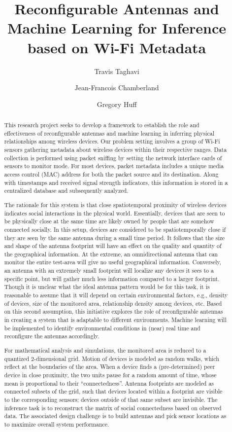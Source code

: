 \documentclass{ursiNRSM}
\title{Reconfigurable Antennas and Machine Learning for Inference based on Wi-Fi Metadata}
\author[org1]{Travis Taghavi}
\author[org1]{Jean-Francois Chamberland}
\author[org1]{Gregory Huff}
\begin{document}
\begin{abstract}

This research project seeks to develop a framework to establish the role and effectiveness of reconfigurable antennas and machine learning in inferring physical relationships among wireless devices.
Our problem setting involves a group of Wi-Fi sensors gathering metadata about wireless devices within their respective ranges.
Data collection is performed using packet sniffing by setting the network interface cards of sensors to monitor mode.
For most devices, packet metadata includes a unique media access control (MAC) address for both the packet source and its destination.
Along with timestamps and received signal strength indicators, this information is stored in a centralized database and subsequently analyzed.

The rationale for this system is that close spatiotemporal proximity of wireless devices indicates social interactions in the physical world.
Essentially, devices that are seen to be physically close at the same time are likely owned by people that are somehow connected socially.
In this setup, devices are considered to be spatiotemporally close if they are seen by the same antenna during a small time period.
It follows that the size and shape of the antenna footprint will have an effect on the quality and quantity of the geographical information.
At the extreme, an omnidirectional antenna that can monitor the entire test-area will give no useful geographical information.
Conversely, an antenna with an extremely small footprint will localize any devices it sees to a specific point, but will gather much less information compared to a larger footprint.
Though it is unclear what the ideal antenna pattern would be for this task, it is reasonable to assume that it will depend on certain environmental factors, e.g., density of devices, size of the monitored area, relationship density among devices, etc.
Based on this second assumption, this initiative explores the role of reconfigurable antennas in creating a system that is adaptable to different environments.
Machine learning will be implemented to identify environmental conditions in (near) real time and reconfigure the antennas accordingly.

For mathematical analysis and simulations, the monitored area is reduced to a quantized 2-dimensional grid.
Motion of devices is modeled as random walks, which reflect at the boundaries of the area.
When a device finds a (pre-determined) peer device in close proximity, the two units pause for a random amount of time, whose mean is proportional to their ``connectedness''.
Antenna footprints are modeled as connected subsets of the grid, such that devices located within a footprint are visible to the corresponding sensors; devices outside of that same subset are invisible.
The inference task is to reconstruct the matrix of social connectedness based on observed data.
The associated design challenge is to build antennas and pick sensor locations as to maximize overall system performance.

\end{abstract}
\end{document}
